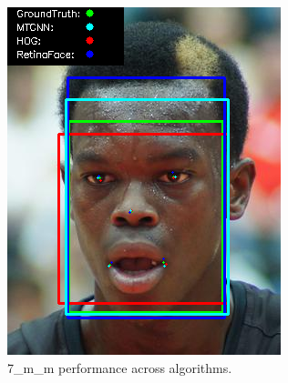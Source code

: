 \documentclass{l4proj}
\begin{document}
\begin{appendices}
\begin{figure}[h!]
\begin{minipage}{0.49\textwidth}
     \includegraphics[width=\textwidth]{images/appendix/7.png}
    \caption{7\_m\_m performance across algorithms.}
    \label{whoopi_result}
  \end{minipage}
\end{figure}


\end{appendices}
\end{document}
